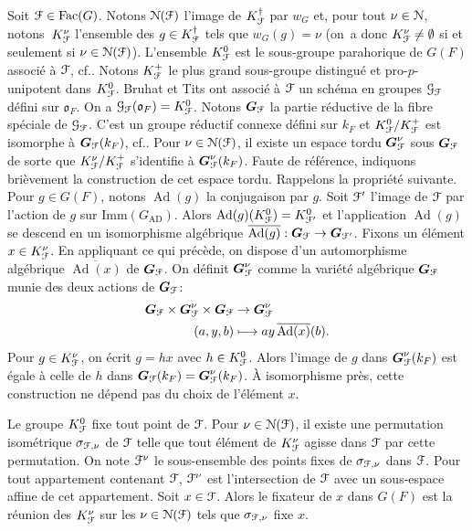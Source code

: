 \documentclass[11pt]{article}
\newcommand{\cf}{cf.\xspace}
\numberwithin{equation}{section}\providecommand{\og}{«\,}\providecommand{\fg}{\,»}
\let\mathcal \EuScript
\newcommand\mto{\mathchoice{\longmapsto}{\mapsto}{\mapsto}{\mapsto}}
\newcommand{\fro}{\mathfrak{o}}
\newcommand{\AD}{\mathrm{AD}}
\newcommand{\Fac}{\mathrm{Fac}}
\newcommand{\Imm}{\mathrm{Imm}}
\DeclareMathOperator{\Ad}{Ad}
\newcommand{\bG}{\boldsymbol{G}}
\newcommand{\cF}{\mathcal{F}}
\newcommand{\cG}{\mathcal{G}}
\newcommand{\cN}{\mathcal{N}}
\theoremstyle{plain}
\theoremstyle{definition}
\begin{document}
Soit $\cF\in \Fac(G)$. Notons $\cN(\cF)$ l'image de $K_{\cF}^{\dag}$ par $w_{G}$ et, pour tout $\nu\in \cN$, notons~$K_{\cF}^{\nu}$ l'ensemble des $g\in K_{\cF}^{\dag}$ tels que $w_{G}(g)=\nu$ (on~a donc $ K_{\cF}^{\nu}\neq\emptyset$ si et seulement si $\nu\in \cN(\cF)$). L'ensemble $K_{\cF}^{0}$ est le sous-groupe parahorique de $G(F)$ associé à $\cF$, \cf \cite[Prop.\,3]{HR}. Notons $K_{\cF}^{+}$ le plus grand sous-groupe distingué et pro-$p$-unipotent dans $K_{\cF}^0$. Bruhat et Tits ont associé à $\cF$ un schéma en groupes $\cG_{\cF}$ défini sur $\fro_{F}$. On a $\cG_{\cF}(\fro_{F})=K_{\cF}^{0}$. Notons $\bG_{\cF}$ la partie réductive de la fibre spéciale de $\cG_{\cF}$. C'est un groupe réductif connexe défini sur $k_{F}$ et $K_{\cF}^0/K_{\cF}^+$ est isomorphe à $\bG_{\cF}(k_{F})$, \cf \cite[Prop.\,3.7]{HV}. Pour $\nu\in \cN(\cF)$, il existe un espace tordu $\bG_{\cF}^{\nu}$ sous $\bG_{\cF}$ de sorte que $K_{\cF}^{\nu}/K_{\cF}^{+}$ s'identifie à $\bG_{\cF}^{\nu}(k_{F})$. Faute de référence, indiquons brièvement la construction de cet espace tordu. Rappelons la propriété suivante. Pour $g\in G(F)$, notons $\Ad(g)$ la conjugaison par $g$. Soit $\cF'$ l'image de $\cF$ par l'action de $g$ sur $\Imm(G_{\AD})$. Alors $\Ad(g)(K_{\cF}^0)=K_{\cF'}^0$ et l'application $\Ad(g)$ se descend en un isomorphisme algébrique $\overline{\Ad(g)}:\bG_{\cF}\to \bG_{\cF'}$. Fixons
un élément $x\in K_{\cF}^{\nu}$. En appliquant ce qui précède, on dispose d'un automorphisme algébrique $\overline{\Ad(x)}$ de $\bG_{\cF}$. On définit $\bG_{\cF}^{\nu}$ comme la variété algébrique $\bG_{\cF}$ munie des deux actions de $\bG_{\cF}$:
\begin{align*}
\bG_{\cF}\times \bG_{\cF}^{\nu}\times \bG_{\cF}&\to\bG_{\cF}^{\nu}\\(a,y,b)&\mto ay\,\overline{\Ad(x)}(b).
\end{align*}
Pour $g\in K_{\cF}^{\nu}$, on écrit $g=hx$ avec $h\in K_{\cF}^0$. Alors l'image de $g$ dans $\bG_{\cF}^{\nu}(k_{F})$ est égale à celle de $h$ dans $\bG_{\cF}(k_{F})=\bG_{\cF}^{\nu}(k_{F})$. À isomorphisme près, cette construction ne dépend pas du choix de l'élément $x$.

Le groupe $K_{\cF}^0$ fixe tout point de $\cF$. Pour $\nu\in \cN(\cF)$, il existe une permutation isométrique $\sigma_{\cF,\nu}$ de $\cF$ telle que tout élément de $K_{\cF}^{\nu}$ agisse dans $\cF$ par cette permutation. On note $\cF^{\nu}$ le sous-ensemble des points fixes de $\sigma_{\cF,\nu}$ dans $\cF$. Pour tout appartement contenant $\cF$, $\cF^{\nu}$ est l'intersection de $\cF$ avec un sous-espace affine de cet appartement. Soit $x\in \cF$. Alors le fixateur de $x$ dans $G(F)$ est la réunion des $K_{\cF}^{\nu}$ sur les $\nu\in \cN(\cF)$ tels que $\sigma_{\cF,\nu}$ fixe $x$.
\end{document}
